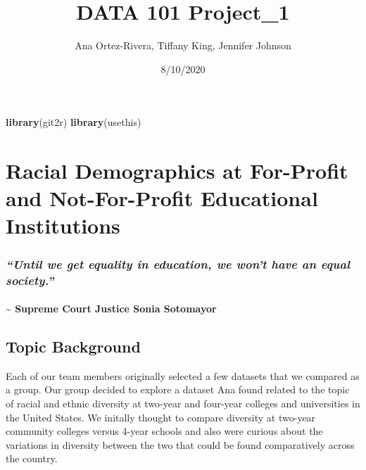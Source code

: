 \documentclass[
]{article}
\title{DATA 101 Project\_1}
\author{Ana Ortez-Rivera, Tiffany King, Jennifer Johnson}
\date{8/10/2020}
\newenvironment{Shaded}{\begin{snugshade}}{\end{snugshade}}
\newcommand{\KeywordTok}[1]{\textcolor[rgb]{0.13,0.29,0.53}{\textbf{#1}}}
\newcommand{\NormalTok}[1]{#1}
\begin{document}
\maketitle

\begin{Shaded}
\begin{Highlighting}[]
\KeywordTok{library}\NormalTok{(git2r)}
\KeywordTok{library}\NormalTok{(usethis)}
\end{Highlighting}
\end{Shaded}

\hypertarget{racial-demographics-at-for-profit-and-not-for-profit-educational-institutions}{%
\section{\texorpdfstring{\textbf{Racial Demographics at For-Profit and
Not-For-Profit Educational
Institutions}}{Racial Demographics at For-Profit and Not-For-Profit Educational Institutions}}\label{racial-demographics-at-for-profit-and-not-for-profit-educational-institutions}}

\hypertarget{until-we-get-equality-in-education-we-wont-have-an-equal-society.}{%
\subsubsection{\texorpdfstring{\emph{``Until we get equality in
education, we won't have an equal
society.''}}{``Until we get equality in education, we won't have an equal society.''}}\label{until-we-get-equality-in-education-we-wont-have-an-equal-society.}}

\hypertarget{supreme-court-justice-sonia-sotomayor}{%
\paragraph{\textasciitilde{} Supreme Court Justice Sonia
Sotomayor}\label{supreme-court-justice-sonia-sotomayor}}

\hypertarget{topic-background}{%
\subsection{\texorpdfstring{\textbf{Topic
Background}}{Topic Background}}\label{topic-background}}

Each of our team members originally selected a few datasets that we
compared as a group. Our group decided to explore a dataset Ana found
related to the topic of racial and ethnic diversity at two-year and
four-year colleges and universities in the United States. We initally
thought to compare diversity at two-year community colleges versus
4-year schools and also were curious about the variations in diversity
between the two that could be found comparatively across the country.
\end{document}
